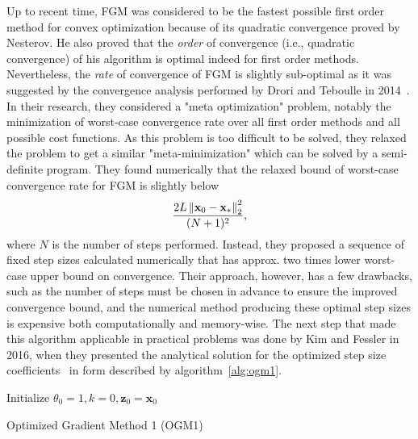 Up to recent time, FGM was considered to be the fastest possible first order method for convex optimization because of its quadratic convergence proved by Nesterov. He also proved that the \textit{order} of convergence (i.e., quadratic convergence) of his algorithm is optimal indeed for first order methods. Nevertheless, the \textit{rate} of convergence of FGM is slightly sub-optimal as it was suggested by the convergence analysis performed by Drori and Teboulle in 2014~\cite{drori_performance_2014}. In their research, they considered a "meta optimization" problem, notably the minimization of worst-case convergence rate over all first order methods and all possible cost functions. As this problem is too difficult to be solved, they relaxed the problem to get a similar "meta-minimization" which can be solved by a semi-definite program. They found numerically that the relaxed bound of worst-case convergence rate for FGM is slightly below
\[\frac{2L\left\lVert\mathbf{x}_0 - \mathbf{x}_*\right\rVert_2^2}{(N+1)^2},\]
where $N$ is the number of steps performed. Instead, they proposed a sequence of fixed step sizes calculated numerically that has approx. two times lower worst-case upper bound on convergence. Their approach, however, has a few drawbacks, such as the number of steps must be chosen in advance to ensure the improved convergence bound, and the numerical method producing these optimal step sizes is expensive both computationally and memory-wise. The next step that made this algorithm applicable in practical problems was done by Kim and Fessler in 2016, when they presented the analytical solution for the optimized step size coefficients~\cite{kim_optimized_2016} in form described by algorithm~\ref{alg:ogm1}.

\begin{algorithm}
    \BlankLine
    Initialize $\theta_0 = 1, k = 0, \mathbf{z}_0 = \mathbf{x}_0$\\
    \caption{Optimized Gradient Method 1 (OGM1)}
    \label{alg:ogm1}
\end{algorithm}

